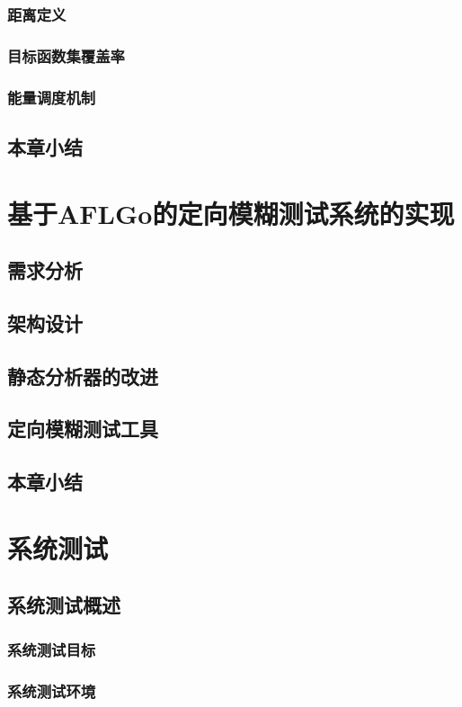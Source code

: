 \documentclass[bachelor]{njupthesis}
\begin{document}
\subsection{距离定义}
\subsection{目标函数集覆盖率}
\subsection{能量调度机制}
\section{本章小结}


\chapter{基于AFLGo的定向模糊测试系统的实现}
\section{需求分析}
\section{架构设计}
\section{静态分析器的改进}
\section{定向模糊测试工具}
\section{本章小结}

\chapter{系统测试}
\section{系统测试概述}
\subsection{系统测试目标}
\subsection{系统测试环境}
\end{document}
